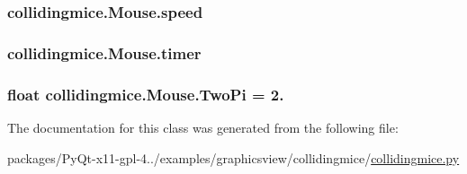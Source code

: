 \subsubsection[{speed}]{\setlength{\rightskip}{0pt plus 5cm}collidingmice.\+Mouse.\+speed}\label{classcollidingmice_1_1Mouse_a0222c861dbe38170b2dde1561d27cbe8}
\hypertarget{classcollidingmice_1_1Mouse_aec5c55af117c07ca3062eee0cbd40f0a}{}
\subsubsection[{timer}]{\setlength{\rightskip}{0pt plus 5cm}collidingmice.\+Mouse.\+timer}\label{classcollidingmice_1_1Mouse_aec5c55af117c07ca3062eee0cbd40f0a}
\hypertarget{classcollidingmice_1_1Mouse_ad561a85df5c1935bef5560d9f8781f7c}{}
\subsubsection[{Two\+Pi}]{\setlength{\rightskip}{0pt plus 5cm}float collidingmice.\+Mouse.\+Two\+Pi = 2.\hspace{0.3cm}{\ttfamily [static]}}\label{classcollidingmice_1_1Mouse_ad561a85df5c1935bef5560d9f8781f7c}


The documentation for this class was generated from the following file\+:\begin{DoxyCompactItemize}
\item 
packages/\+Py\+Qt-\/x11-\/gpl-\/4../examples/graphicsview/collidingmice/\hyperlink{collidingmice_8py}{collidingmice.\+py}\end{DoxyCompactItemize}
